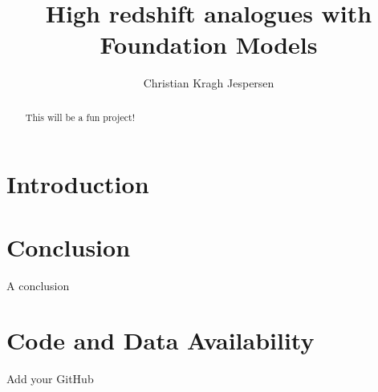\documentclass[twocolumn,astrosymb,tighten,twocolappendix,longbib,trackchanges]{aastex7} %
\begin{document}
\title{High redshift analogues with Foundation Models}

\author[0000-0002-8896-6496, gname=Christian Kragh, sname=Jespersen]{Christian Kragh Jespersen}






\begin{abstract}
This will be a fun project!
\end{abstract}


\section{Introduction} \label{sec:intro}


\section{Conclusion} \label{sec:conc}

A conclusion

\section{Code and Data Availability} \label{sec:dataavail}

Add your GitHub
\end{document}
